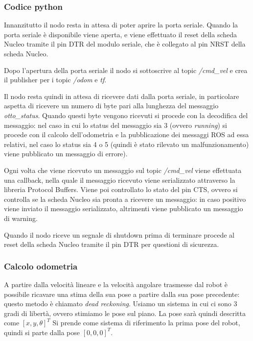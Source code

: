 \subsubsection{Codice python}
Innanzitutto il nodo resta in attesa di poter aprire la porta seriale. Quando la porta seriale è disponibile viene aperta, e viene effettuato il reset della scheda Nucleo tramite il pin DTR del modulo seriale, che è collegato al pin NRST della scheda Nucleo.

Dopo l'apertura della porta seriale il nodo si sottoscrive al topic \textit{/cmd\_vel} e crea il publisher per i topic \textit{/odom} e \textit{tf}.

Il nodo resta quindi in attesa di ricevere dati dalla porta seriale, in particolare aspetta di ricevere un numero di byte pari alla lunghezza del messaggio \textit{otto\_status}. Quando questi byte vengono ricevuti si procede con la decodifica del messaggio: nel caso in cui lo status del messaggio sia 3 (ovvero \textit{running}) si procede con il calcolo dell'odometria e la pubblicazione dei messaggi ROS ad essa relativi, nel caso lo status sia 4 o 5 (quindi è stato rilevato un malfunzionamento) viene pubblicato un messaggio di errore).

Ogni volta che viene ricevuto un messaggio sul topic \textit{/cmd\_vel} viene effettuata una callback, nella quale il messaggio ricevuto viene serializzato attraverso la libreria Protocol Buffers. Viene poi controllato lo stato del pin CTS, ovvero si controlla se la scheda Nucleo sia pronta a ricevere un messaggio: in caso positivo viene inviato il messaggio serializzato, altrimenti viene pubblicato un messaggio di warning.

Quando il nodo riceve un segnale di shutdown prima di terminare procede al reset della scheda Nucleo tramite il pin DTR per questioni di sicurezza.

\subsubsection{Calcolo odometria}
A partire dalla velocità lineare e la velocità angolare trasmesse dal robot è possibile ricavare una stima della sua pose a partire dalla sua pose precedente: questo metodo è chiamato \textit{dead reckoning}.
Usiamo un sistema in cui ci sono 3 gradi di libertà, ovvero stimiamo le pose sul piano. La pose sarà quindi descritta come $[x,y,\theta]^T$
Si prende come sistema di riferimento la prima pose del robot, quindi si parte dalla pose $[0,0,0]^T$.

